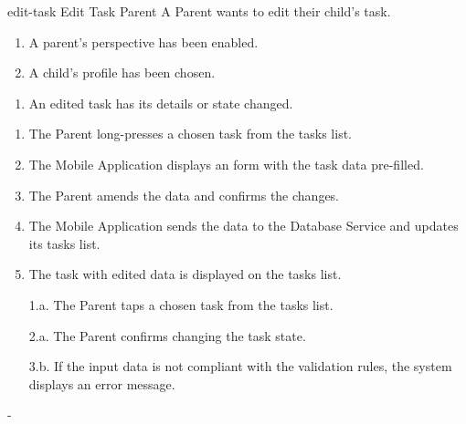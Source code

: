 {edit-task}
{Edit Task}
{Parent}
{A Parent wants to edit their child's task.}
{\begin{enumerate} %
    \item A parent's perspective has been enabled.
    \item A child's profile has been chosen.
\end{enumerate}}
{\begin{enumerate} %
   \item An edited task has its details or state changed.
\end{enumerate}}
{\begin{enumerate} %
   \item The Parent long-presses a chosen task from the tasks list.
   \item The Mobile Application displays an  form with the task data pre-filled.
   \item The Parent amends the data and confirms the changes.
   \item The Mobile Application sends the data to the Database Service and updates its tasks list.
   \item The task with edited data is displayed on the tasks list.
\end{enumerate}}
{\begin{enumerate} %
    \item[1.a.] The Parent taps a chosen task from the tasks list.
    \item[2.a.] The Parent confirms changing the task state.
\end{enumerate}
}
{\begin{enumerate} %
    \item[3.b.] If the input data is not compliant with the validation rules, the system displays an error message.
\end{enumerate}}
{-} %



